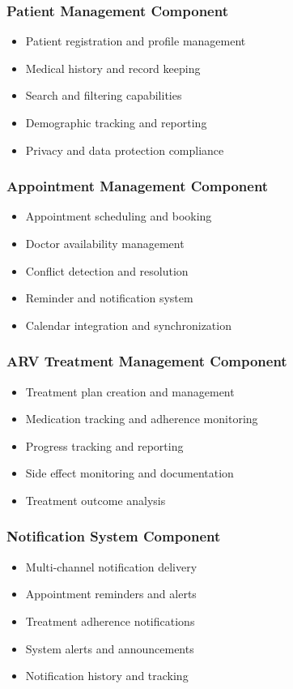 \documentclass[12pt,a4paper]{article}
\begin{document}
\subsubsection{Patient Management Component}
\begin{itemize}
    \item Patient registration and profile management
    \item Medical history and record keeping
    \item Search and filtering capabilities
    \item Demographic tracking and reporting
    \item Privacy and data protection compliance
\end{itemize}

\subsubsection{Appointment Management Component}
\begin{itemize}
    \item Appointment scheduling and booking
    \item Doctor availability management
    \item Conflict detection and resolution
    \item Reminder and notification system
    \item Calendar integration and synchronization
\end{itemize}

\subsubsection{ARV Treatment Management Component}
\begin{itemize}
    \item Treatment plan creation and management
    \item Medication tracking and adherence monitoring
    \item Progress tracking and reporting
    \item Side effect monitoring and documentation
    \item Treatment outcome analysis
\end{itemize}

\subsubsection{Notification System Component}
\begin{itemize}
    \item Multi-channel notification delivery
    \item Appointment reminders and alerts
    \item Treatment adherence notifications
    \item System alerts and announcements
    \item Notification history and tracking
\end{itemize}
\end{document}
